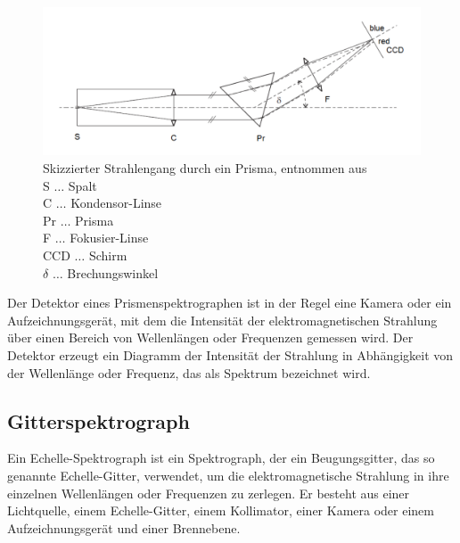 \documentclass[12pt,english,ngerman]{scrartcl}
\begin{document}
\begin{figure}[H]
	\begin{center}
		\includegraphics[width =\textwidth]{./figures/skizze.png}
	\end{center}
	\caption[Skizzierter Strahlengang durch ein Prisma] {Skizzierter Strahlengang durch ein
		Prisma, entnommen aus~\cite{noauthor_spectrograph_2016} \\
		S \(\dots\) Spalt                                       \\
		C \(\dots\) Kondensor-Linse                             \\
		Pr \(\dots\) Prisma                                     \\
		F \(\dots\) Fokusier-Linse                              \\
		CCD \(\dots\) Schirm                                    \\
		$\delta$ \(\dots\) Brechungswinkel
	}\label{fig:skizze}
\end{figure}

Der Detektor eines Prismenspektrographen ist in der Regel eine Kamera oder ein
Aufzeichnungsgerät, mit dem die Intensität der elektromagnetischen Strahlung
über einen Bereich von Wellenlängen oder Frequenzen gemessen wird. Der Detektor
erzeugt ein Diagramm der Intensität der Strahlung in Abhängigkeit von der
Wellenlänge oder Frequenz, das als Spektrum bezeichnet wird.

\subsection{Gitterspektrograph}

Ein Echelle-Spektrograph ist ein Spektrograph, der ein Beugungsgitter, das so
genannte Echelle-Gitter, verwendet, um die elektromagnetische Strahlung in ihre
einzelnen Wellenlängen oder Frequenzen zu zerlegen. Er besteht aus einer
Lichtquelle, einem Echelle-Gitter, einem Kollimator, einer Kamera oder einem
Aufzeichnungsgerät und einer Brennebene.
\end{document}
